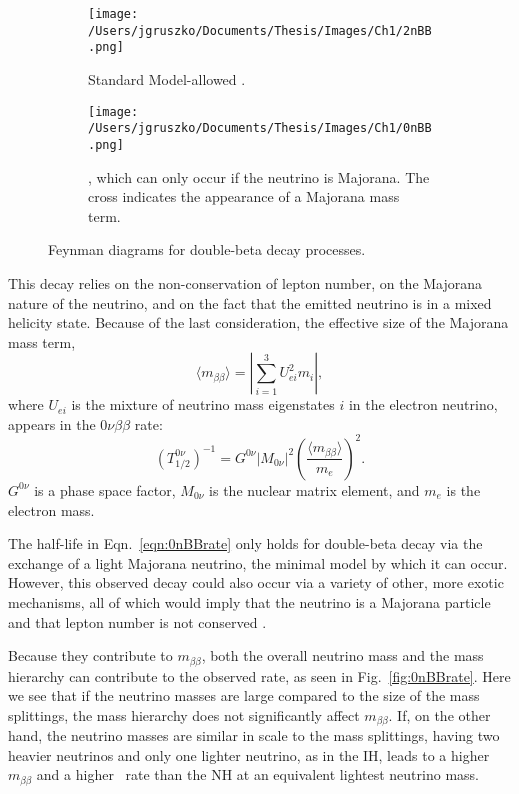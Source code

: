 \begin{figure}[h]
 \centering
    \begin{subfigure}[t]{.40\textwidth}
      \texttt{[image: /Users/jgruszko/Documents/Thesis/Images/Ch1/2nBB.png]}
       \caption{Standard Model-allowed \twonubb.}
        \label{fig:2nBB}
        \end{subfigure}   
         \hfil
        \begin{subfigure}[t]{0.4\textwidth}
      \texttt{[image: /Users/jgruszko/Documents/Thesis/Images/Ch1/0nBB.png]} 
      \caption{\nonubb, which can only occur if the neutrino is Majorana. The cross indicates the appearance of a Majorana mass term.}
      \label{fig:0nBB}
    \end{subfigure}   
    \caption{Feynman diagrams for double-beta decay processes.}
\end{figure}

This decay relies on the non-conservation of lepton number, on the Majorana nature of the neutrino, and on the fact that the emitted neutrino is in a mixed helicity state. Because of the last consideration, the effective size of the Majorana mass term, 
 $$\langle m_{\beta\beta} \rangle = |\sum\limits_{i=1}^3 U^2_{ei}m_i|,$$
 where $U_{ei}$ is the mixture of neutrino mass eigenstates $i$ in the electron neutrino, appears in the $0\nu\beta\beta$ rate:
 \begin{equation}
 (T_{1/2}^{0\nu})^{-1} = G^{0\nu}|M_{0\nu}|^{2}\left(\frac{\langle m_{\beta\beta} \rangle}{m_e}\right)^2 .
 \label{eqn:0nBBrate}
 \end{equation}
 $G^{0\nu}$ is a phase space factor, $M_{0\nu}$ is the nuclear matrix element, and $m_e$ is the electron mass. 

The half-life in Eqn.~\ref{eqn:0nBBrate} only holds for double-beta decay via the exchange of a light Majorana neutrino, the minimal model by which it can occur. However, this observed decay could also occur via a variety of other, more exotic mechanisms, all of which would imply that the neutrino is a Majorana particle and that lepton number is not conserved \cite{Schechter1982}. 
 
Because they contribute to $m_{\beta\beta}$, both the overall neutrino mass and the mass hierarchy can contribute to the observed rate, as seen in Fig.~\ref{fig:0nBBrate}. Here we see that if the neutrino masses are large compared to the size of the mass splittings, the mass hierarchy does not significantly affect $m_{\beta\beta}$. If, on the other hand, the neutrino masses are similar in scale to the mass splittings, having two heavier neutrinos and only one lighter neutrino, as in the IH, leads to a higher $m_{\beta\beta}$ and a higher \nonubb\ rate than the NH at an equivalent lightest neutrino mass. 
 
